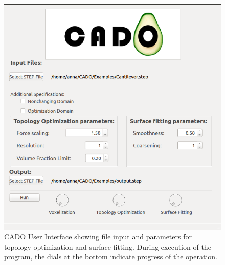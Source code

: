 \begin{figure}[h]
\centering
\includegraphics[scale=0.5]{Pictures/CADO_mainWindowParameters.png}
\caption{CADO User Interface showing file input and parameters for topology optimization and surface fitting. During execution of the program, the dials at the bottom indicate progress of the operation.}
\label{fig:mainWindowParameters}
\end{figure}
